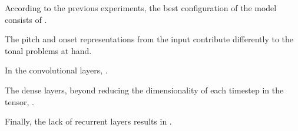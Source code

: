 
According to the previous experiments, the best
configuration of the model consists of .

The pitch and onset representations from the input
contribute differently to the tonal problems at hand.

In the convolutional layers, .

The dense layers, beyond reducing the dimensionality of each
timestep in the tensor, .

Finally, the lack of recurrent layers results in
.
